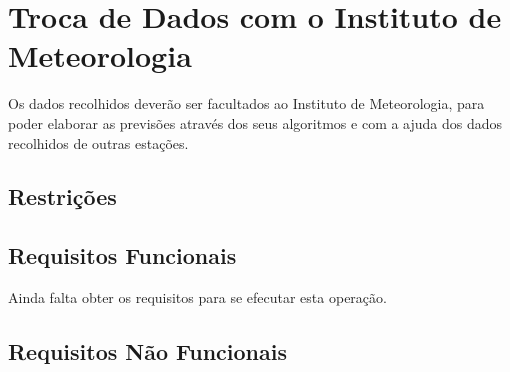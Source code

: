 \chapter{Troca de Dados com o Instituto de Meteorologia}
Os dados recolhidos deverão ser facultados ao Instituto de Meteorologia, para poder elaborar as previsões através dos seus algoritmos e com a ajuda dos dados recolhidos de outras estações.

\section{Restrições}

\section{Requisitos Funcionais}
Ainda falta obter os requisitos para se efecutar esta operação.

\section{Requisitos Não Funcionais}
